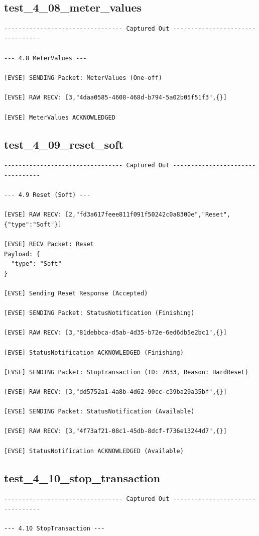 \documentclass{article}
\begin{document}
\subsection*{test\_4\_08\_meter\_values}
\begin{lstlisting}
--------------------------------- Captured Out ---------------------------------

--- 4.8 MeterValues ---

[EVSE] SENDING Packet: MeterValues (One-off)

[EVSE] RAW RECV: [3,"4daa0585-4608-468d-b794-5a02b05f51f3",{}]

[EVSE] MeterValues ACKNOWLEDGED
\end{lstlisting}
\subsection*{test\_4\_09\_reset\_soft}
\begin{lstlisting}
--------------------------------- Captured Out ---------------------------------

--- 4.9 Reset (Soft) ---

[EVSE] RAW RECV: [2,"fd3a617feee811f091f50242c0a8300e","Reset",{"type":"Soft"}]

[EVSE] RECV Packet: Reset
Payload: {
  "type": "Soft"
}

[EVSE] Sending Reset Response (Accepted)

[EVSE] SENDING Packet: StatusNotification (Finishing)

[EVSE] RAW RECV: [3,"81debbca-d5ab-4d35-b72e-6ed6db5e2bc1",{}]

[EVSE] StatusNotification ACKNOWLEDGED (Finishing)

[EVSE] SENDING Packet: StopTransaction (ID: 7633, Reason: HardReset)

[EVSE] RAW RECV: [3,"dd5752a1-4a8b-4d62-90cc-c39ba29a35bf",{}]

[EVSE] SENDING Packet: StatusNotification (Available)

[EVSE] RAW RECV: [3,"4f73af21-08c1-45db-8dcf-f736e13244d7",{}]

[EVSE] StatusNotification ACKNOWLEDGED (Available)
\end{lstlisting}
\subsection*{test\_4\_10\_stop\_transaction}
\begin{lstlisting}
--------------------------------- Captured Out ---------------------------------

--- 4.10 StopTransaction ---
\end{lstlisting}
\end{document}
